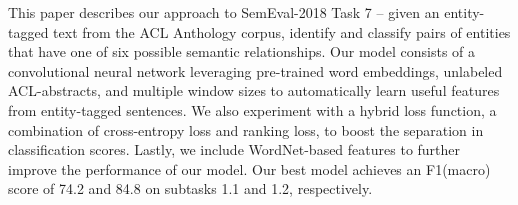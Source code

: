 This paper describes our approach to SemEval-2018 Task 7 -- given an entity-tagged text from the ACL Anthology corpus, identify and classify pairs of entities that have one of six possible semantic relationships. Our model consists of a convolutional neural network leveraging pre-trained word embeddings, unlabeled ACL-abstracts, and multiple window sizes to automatically learn useful features from entity-tagged sentences. We also experiment with a hybrid loss function, a combination of cross-entropy loss and ranking loss, to boost the separation in classification scores. Lastly, we include WordNet-based features to further improve the performance of our model. Our best model achieves an F1(macro) score of 74.2 and 84.8 on subtasks 1.1 and 1.2, respectively.
